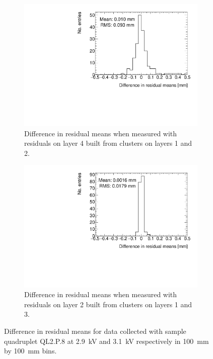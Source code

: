\begin{figure}
\centering
\begin{subfigure}{.45\textwidth}
  \centering
  \includegraphics[width=0.97\linewidth]{figures/figure_compare_residual_fits_QL2P08_2900V_2021-05-21_minus_QL2P08_3100V_2021-05-21_layer4_fixedlayers12_mean_differences.pdf}
  \caption{Difference in residual means when measured with residuals on layer 4 built from clusters on layers 1 and 2.}
  \label{fig:voltage_compare_fits_412}
\end{subfigure}\hfill
\begin{subfigure}{.45\textwidth}
  \centering
  \includegraphics[width=0.97\linewidth]{figures/figure_compare_residual_fits_QL2P08_2900V_2021-05-21_minus_QL2P08_3100V_2021-05-21_layer2_fixedlayers13_mean_differences.pdf}
  \caption{Difference in residual means when measured with residuals on layer 2 built from clusters on layers 1 and 3.}
  \label{fig:voltage_compare_fits_213}
\end{subfigure}\hfill
\caption{Difference in residual means for data collected with sample quadruplet QL2.P.8 at \SI{2.9}{kV} and \SI{3.1}{kV} respectively in \SI{100}{\milli\meter} by \SI{100}{\milli\meter} bins.}
\label{fig:voltage_compare_fits}
\end{figure}

